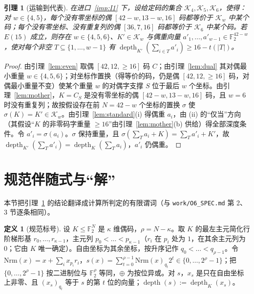 \documentclass[11pt]{ctexart}
\newtheorem{lemma}{引理}
\theoremstyle{definition}
\newtheorem{definition}{定义}
\newcommand{\F}{\mathbb{F}_2}
\newcommand{\depth}{\operatorname{depth}}
\begin{document}
\begin{lemma}[运输到代表]\label{lem:transport}
在进口~\ref{imp:I1} 下，设给定码的集合 $\mathcal K_4,\mathcal K_5,\mathcal K_6$，使得：对 $w\in\{4,5\}$，每个没有零坐标的偶 $[42-w,13-w,16]$ 码都等价于 $\mathcal K_w$ 中某个码；每个没有零坐标、没有重复列的偶 $[36,7,16]$ 码都等价于 $\mathcal K_6$ 中某个码。若 $E(15)$ 成立，则存在 $w\in\{4,5,6\}$、$K'\in\mathcal K_w$ 与偶重向量 $a'_1,\dots,a'_{w-1}\in\F^{42-w}$，使对每个非空 $T\subseteq\{1,\dots,w-1\}$ 有 $\depth_{K'}(\sum_{i\in T}a'_i)\ge16-t(|T|)$。
\end{lemma}
\begin{proof}
由引理~\ref{lem:even} 取偶 $[42,12,\ge16]$ 码 $C$；由引理~\ref{lem:dual} 其对偶最小重量 $w\in\{4,5,6\}$；对坐标作置换（得等价的码，仍是偶 $[42,12,\ge16]$ 码，对偶最小重量不变）使某个重量 $w$ 的对偶字支撑 $S$ 位于最后 $w$ 个坐标。由引理~\ref{lem:mother}，$K=C_S$ 是没有零坐标的偶 $[42-w,13-w,16]$ 码，且 $w=6$ 时没有重复列；故按假设存在前 $N=42-w$ 个坐标的置换 $\sigma$ 使 $\sigma(K)=K'\in\mathcal K_w$。由引理~\ref{lem:standard}(i) 得偶重 $a_i$，由 (ii) 的“仅当”方向（其假设“$K$ 的非零码字重量 $\ge16$”由引理~\ref{lem:mother}(b) 供给）得全部深度条件。令 $a'_i=\sigma(a_i)$。$\sigma$ 保持重量，且 $\sigma(\sum_Ta_i+K)=\sum_Ta'_i+K'$，故 $\depth_{K'}(\sum_Ta'_i)=\depth_K(\sum_Ta_i)$，$a'_i$ 仍偶重。
\end{proof}

\section{规范伴随式与“解”}

本节把引理~\ref{lem:transport} 的结论翻译成计算所判定的有限谓词（与 \texttt{work/O6\_SPEC.md} 第 2、3 节逐条相同）。

\begin{definition}[规范标号]\label{def:label}
设 $K\le\F^N$ 是 $\kappa$ 维偶码，$\rho=N-\kappa$。取 $K$ 的最左主元简化行阶梯形基 $r_0,\dots,r_{\kappa-1}$，主元列 $p_0<\dots<p_{\kappa-1}$（$r_i$ 在 $p_i$ 处为 $1$，在其余主元列为 $0$；它由 $K$ 唯一确定）。自由坐标为其余坐标，按升序记作 $q_0<\dots<q_{\rho-1}$。令 $\mathrm{Nrm}(x)=x+\sum_i x_{p_i}r_i$，$s(x)=\sum_{t=0}^{\rho-1}\mathrm{Nrm}(x)_{q_t}2^t\in\{0,\dots,2^\rho-1\}$；把 $\{0,\dots,2^\rho-1\}$ 按二进制位与 $\F^\rho$ 等同，$\oplus$ 为按位异或。对 $s$，$x_s$ 是只在自由坐标上非零、且 $(x_s)_{q_t}$ 等于 $s$ 的第 $t$ 位的向量；$\depth(s):=\depth_K(x_s)$。
\end{definition}
\end{document}
